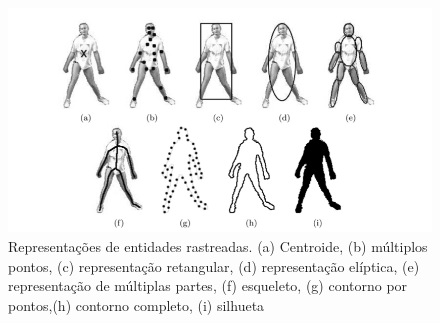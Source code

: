 	\begin{figure}[hbt]
		\begin{center}
			\includegraphics[scale=0.5]{figuras/2.FundamentacaoTeorica/representacao.png}
		\end{center}
		\caption{Representações de entidades rastreadas. (a) Centroide, (b) múltiplos pontos, (c) representação retangular, (d) representação elíptica, (e) representação de múltiplas partes, (f) esqueleto, (g) contorno por pontos,(h) contorno completo, (i) silhueta~\cite{yilmaz}}
		\label{representacao}
	\end{figure}

